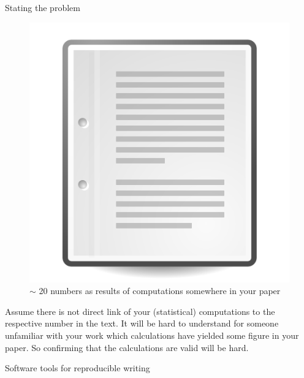 \documentclass[final,hyperref={pdfpagelabels=false}]{beamer}
\begin{document}
\begin{frame}{}
\begin{columns}[t]
\begin{column}{.48\linewidth}
\begin{block}{Stating the problem}
\begin{minipage}[t]{0.55\textwidth}
\begin{figure}[ht]
             \includegraphics[valign=T,scale=.5]{logo/paper_icon}
                 \caption{ $\sim$ 20 numbers as results of computations somewhere in your paper} 
           \end{figure}
          \end{minipage}   
          \newline
          Assume there is not direct link of your (statistical) computations to the respective number in the text.
          It will be hard to understand for someone unfamiliar with your work which calculations have yielded some figure in your paper. So confirming that the calculations are valid will be hard.  
         \end{block}     

      
      
  \begin{block}{Software tools for reproducible writing}
    

\end{block}
\end{column}
\end{columns}
\end{frame}
\end{document}
